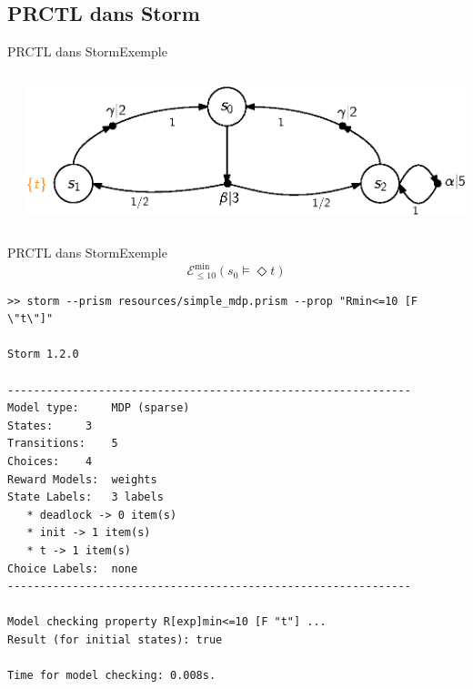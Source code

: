 \documentclass[compress]{beamer}
\begin{document}
\subsection{PRCTL dans Storm}
\begin{frame}{PRCTL dans Storm}{Exemple}
\begin{columns}
  \begin{column}{0.35\linewidth}

  \end{column}
  \begin{column}{0.65\linewidth}
    \begin{center}
      \includegraphics[width=\linewidth]{resources/simple_mdp}
    \end{center}
  \end{column}
\end{columns}
\end{frame}

\begin{frame}[fragile]{PRCTL dans Storm}{Exemple}
\vspace{-0.05\linewidth}
  \[
    \mathcal{E}_{\leq 10}^{\min}(s_0 \models \Diamond t)
  \]
  {\tiny
  \begin{verbatim}
>> storm --prism resources/simple_mdp.prism --prop "Rmin<=10 [F \"t\"]"

Storm 1.2.0

--------------------------------------------------------------
Model type: 	MDP (sparse)
States: 	3
Transitions: 	5
Choices: 	4
Reward Models:  weights
State Labels: 	3 labels
   * deadlock -> 0 item(s)
   * init -> 1 item(s)
   * t -> 1 item(s)
Choice Labels: 	none
--------------------------------------------------------------

Model checking property R[exp]min<=10 [F "t"] ...
Result (for initial states): true

Time for model checking: 0.008s.
  \end{verbatim}
  }
\end{frame}
\end{document}

